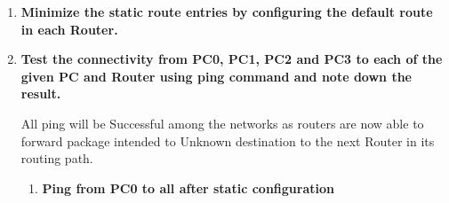 \documentclass[a4paper,11pt]{article}
\begin{document}
\begin{enumerate}
    \item \textbf{ Minimize the static route entries by configuring the default route in each Router.}




    \item\textbf{  Test the connectivity from PC0, PC1, PC2 and PC3 to each of the given PC and Router using ping command and note down the result.}

          All ping will be Successful among the networks as routers are now able to forward package intended to Unknown destination  to  the next Router in its routing path.
          \begin{enumerate}
              \item \textbf{Ping from PC0 to all after static configuration}



\end{enumerate}
\end{enumerate}
\end{document}
